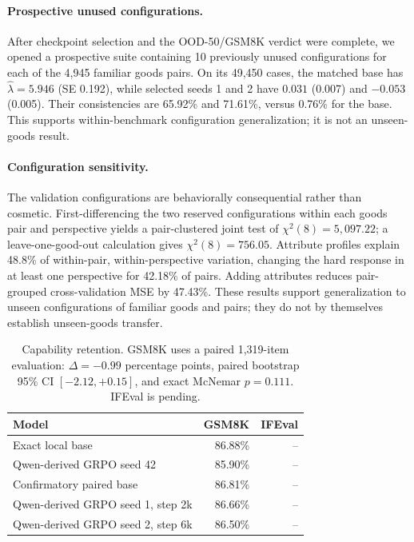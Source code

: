 \documentclass[letterpaper]{article} %
\begin{document}
\paragraph{Prospective unused configurations.}
After checkpoint selection and the OOD-50/GSM8K verdict were complete, we
opened a prospective suite containing 10 previously unused configurations for
each of the 4,945 familiar goods pairs. On its 49,450 cases, the matched base
has $\widehat\lambda=5.946$ (SE 0.192), while selected seeds 1 and 2 have
$0.031$ (0.007) and $-0.053$ (0.005). Their consistencies are 65.92\% and
71.61\%, versus 0.76\% for the base. This supports within-benchmark
configuration generalization; it is not an unseen-goods result.

\paragraph{Configuration sensitivity.}
The validation configurations are behaviorally consequential rather than
cosmetic. First-differencing the two reserved configurations within each goods
pair and perspective yields a pair-clustered joint test of
$\chi^2(8)=5{,}097.22$; a leave-one-good-out calculation gives
$\chi^2(8)=756.05$. Attribute profiles explain 48.8\% of within-pair,
within-perspective variation, changing the hard response in at least one
perspective for 42.18\% of pairs. Adding attributes reduces pair-grouped
cross-validation MSE by 47.43\%. These results support generalization to
unseen configurations of familiar goods and pairs; they do not by themselves
establish unseen-goods transfer.

\begin{table}[t]
\centering
\begin{tabular}{lrr}
\toprule
Model & GSM8K & IFEval \\
\midrule
Exact local base & 86.88\% & -- \\
Qwen-derived GRPO seed 42 & 85.90\% & -- \\
Confirmatory paired base & 86.81\% & -- \\
Qwen-derived GRPO seed 1, step 2k & 86.66\% & -- \\
Qwen-derived GRPO seed 2, step 6k & 86.50\% & -- \\
\bottomrule
\end{tabular}
\caption{Capability retention. GSM8K uses a paired 1,319-item evaluation:
$\Delta=-0.99$ percentage points, paired bootstrap 95\% CI
$[-2.12,+0.15]$, and exact McNemar $p=0.111$. IFEval is pending.}
\label{tab:capability}
\end{table}
\end{document}
